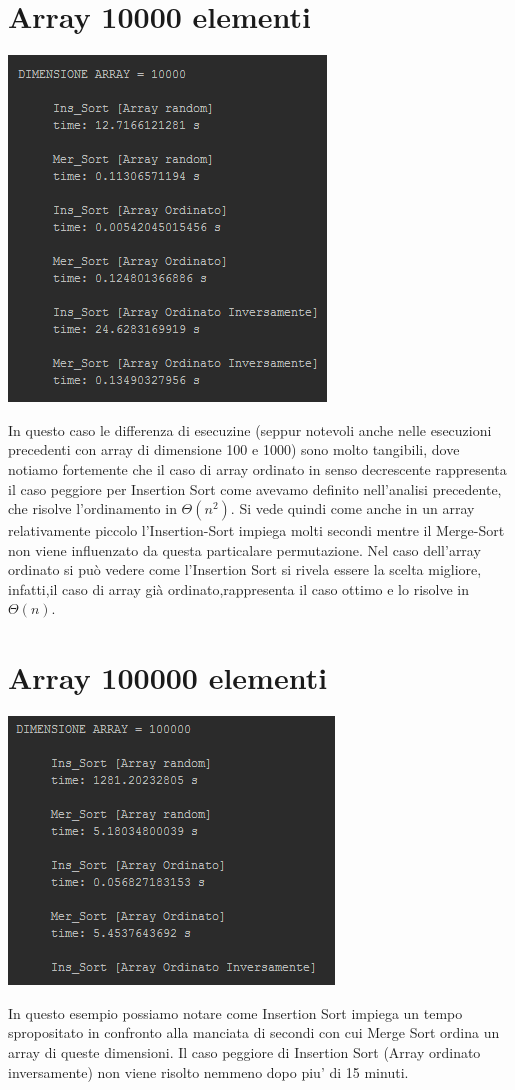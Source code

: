 \documentclass{article}
\begin{document}
\section{Array 10000 elementi}
\begin{center}
\includegraphics{photo10000.png}
\end{center}

In questo caso le differenza di esecuzine (seppur notevoli anche nelle esecuzioni precedenti con array di dimensione 100 e 1000) sono molto tangibili, dove notiamo fortemente che il caso di array ordinato in senso decrescente rappresenta il caso peggiore per Insertion Sort come avevamo definito nell'analisi precedente, che risolve l’ordinamento in $\Theta(n^2)$. Si vede quindi come anche in un array relativamente piccolo l’Insertion-Sort impiega molti secondi mentre il Merge-Sort non viene influenzato da questa particalare permutazione.
Nel caso dell’array ordinato si può vedere come l’Insertion Sort si rivela
essere la scelta migliore, infatti,il caso di array già ordinato,rappresenta
il caso ottimo e lo risolve in $\Theta(n)$. 

\section{Array 100000 elementi}
\begin{center}
\includegraphics{photo100000.png}
\end{center}

In questo esempio possiamo notare come Insertion Sort impiega un tempo spropositato in confronto alla manciata di secondi con cui Merge Sort ordina un array di queste dimensioni. Il caso peggiore di Insertion Sort (Array ordinato inversamente) non viene risolto nemmeno dopo piu' di 15 minuti.
\end{document}
